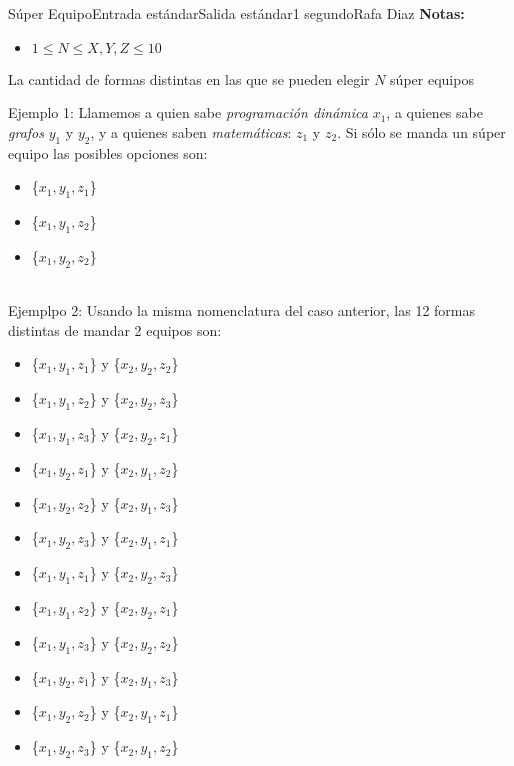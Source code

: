 \begin{problem}{Súper Equipo}{Entrada estándar}{Salida estándar}{1 segundo}{}{Rafa Diaz}
\textbf{Notas:}
\begin{itemize}
    \item $1 \le N \le X, Y, Z \le 10$
\end{itemize}

\OutputFile

La cantidad de formas distintas en las que se pueden elegir $N$ súper equipos
\Example

\begin{example}
\end{example}



Ejemplo 1:
Llamemos a quien sabe \emph{programación dinámica} $x_1$, a quienes sabe \emph{grafos} $y_1$ y $y_2$, y a quienes saben \emph{matemáticas}: $z_1$ y $z_2$. Si sólo se manda un súper equipo las posibles opciones son: \begin{itemize}
    \item \{$x_1, y_1, z_1$\}
    \item \{$x_1, y_1, z_2$\}
    \item \{$x_1, y_2, z_2$\}
\end{itemize}  
\\

Ejemplpo 2:
Usando la misma nomenclatura del caso anterior, las 12 formas distintas de mandar 2 equipos son:
\begin{itemize}
\item  \{$x_1, y_1, z_1$\} y \{$x_2, y_2, z_2$\}
\item  \{$x_1, y_1, z_2$\} y \{$x_2, y_2, z_3$\}
\item  \{$x_1, y_1, z_3$\} y \{$x_2, y_2, z_1$\}
\item  \{$x_1, y_2, z_1$\} y \{$x_2, y_1, z_2$\}
\item  \{$x_1, y_2, z_2$\} y \{$x_2, y_1, z_3$\}
\item  \{$x_1, y_2, z_3$\} y \{$x_2, y_1, z_1$\}
\item  \{$x_1, y_1, z_1$\} y \{$x_2, y_2, z_3$\}
\item  \{$x_1, y_1, z_2$\} y \{$x_2, y_2, z_1$\}
\item  \{$x_1, y_1, z_3$\} y \{$x_2, y_2, z_2$\}
\item  \{$x_1, y_2, z_1$\} y \{$x_2, y_1, z_3$\}
\item  \{$x_1, y_2, z_2$\} y \{$x_2, y_1, z_1$\}
\item  \{$x_1, y_2, z_3$\} y \{$x_2, y_1, z_2$\}
\end{itemize}
\end{problem}
